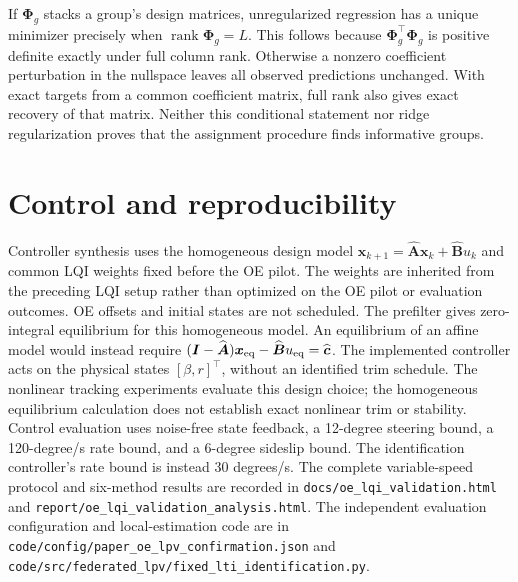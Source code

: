 \documentclass[10pt]{article}
\newcommand{\focusrev}[1]{\textcolor{focusedrevision}{#1}}
\begin{document}
If $\boldsymbol\Phi_g$ stacks a group's design matrices, unregularized
regression has a unique minimizer precisely when
$\operatorname{rank}\boldsymbol\Phi_g=L$. This follows because
$\boldsymbol\Phi_g^\top\boldsymbol\Phi_g$ is positive definite exactly
under full column rank. Otherwise a nonzero coefficient perturbation in
the nullspace leaves all observed predictions unchanged. With exact targets
from a common coefficient matrix, full rank also gives exact recovery of
that matrix. Neither this conditional statement nor ridge regularization
proves that the assignment procedure finds informative groups.

\section{Control and reproducibility}
\focusrev{Controller synthesis uses the homogeneous design model
$\boldsymbol x_{k+1}=\widehat{\boldsymbol A}\boldsymbol x_k+
\widehat{\boldsymbol B}u_k$ and common LQI weights fixed before the OE pilot.
The weights are inherited from the preceding LQI setup rather than optimized
on the OE pilot or evaluation outcomes. OE offsets and initial states are not
scheduled. The prefilter gives zero-integral equilibrium for this homogeneous
model. An equilibrium of an affine model would instead require
$(\boldsymbol I-\widehat{\boldsymbol A})\boldsymbol x_{\rm eq}
-\widehat{\boldsymbol B}u_{\rm eq}=\widehat{\boldsymbol c}$.
The implemented controller acts on the physical states $[\beta,r]^\top$,
without an identified trim schedule. The nonlinear tracking experiments
evaluate this design choice; the homogeneous equilibrium calculation does not
establish exact nonlinear trim or stability.} Control evaluation
uses noise-free state feedback, a 12-degree steering bound, a 120-degree/s
rate bound, and a 6-degree sideslip bound. The identification controller's
rate bound is instead 30 degrees/s.
The complete variable-speed protocol and six-method results are recorded in
\texttt{docs/oe\_lqi\_validation.html} and
\texttt{report/oe\_lqi\_validation\_analysis.html}.
The independent evaluation configuration and local-estimation code are in
\texttt{code/config/paper\_oe\_lpv\_confirmation.json} and
\texttt{code/src/federated\_lpv/fixed\_lti\_identification.py}.
\end{document}
